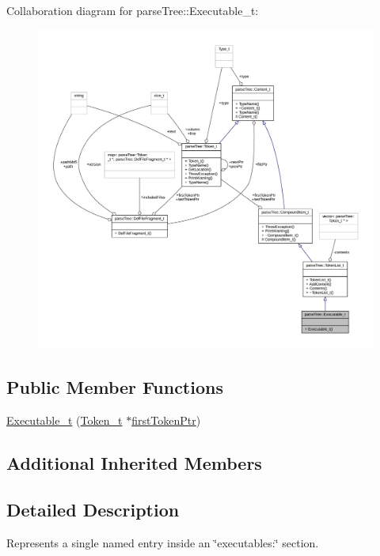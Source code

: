 Collaboration diagram for parse\+Tree\+:\+:Executable\+\_\+t\+:
\nopagebreak
\begin{figure}[H]
\begin{center}
\leavevmode
\includegraphics[width=350pt]{structparse_tree_1_1_executable__t__coll__graph}
\end{center}
\end{figure}
\subsection*{Public Member Functions}
\begin{DoxyCompactItemize}
\item 
\hyperlink{structparse_tree_1_1_executable__t_ab481f14cdf7960c3acff99319b16b433}{Executable\+\_\+t} (\hyperlink{structparse_tree_1_1_token__t}{Token\+\_\+t} $\ast$\hyperlink{structparse_tree_1_1_compound_item__t_a587020c943e760cb0152dd8cd31e21ef}{first\+Token\+Ptr})
\end{DoxyCompactItemize}
\subsection*{Additional Inherited Members}


\subsection{Detailed Description}
Represents a single named entry inside an \char`\"{}executables\+:\char`\"{} section. 

